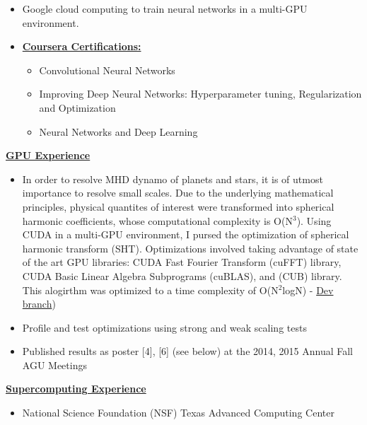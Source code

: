 \documentclass[11pt]{ltxdoc}
\begin{document}
\begin{description}
\begin{itemize}
\begin{itemize}
\begin{itemize}
        	    \end{itemize}
        	\end{itemize}
        \item Google cloud computing to train neural networks in a multi-GPU environment.
        \item[] \textbf{\underline{Coursera Certifications:}}
        \begin{itemize}
          \item Convolutional Neural Networks
          \item Improving Deep Neural Networks: Hyperparameter tuning, Regularization and Optimization
          \item Neural Networks and Deep Learning
        \end{itemize}
      \end{itemize}
      
    \item[] \textbf{\underline{GPU Experience}}
    \begin{itemize}
    		\item In order to resolve MHD dynamo of planets and stars, it is of utmost importance to resolve small scales. Due to the underlying mathematical principles, physical quantites of interest were transformed into spherical harmonic coefficients, whose computational complexity is O(N$^3$). Using CUDA in a multi-GPU environment, I pursed the optimization of spherical harmonic transform (SHT). Optimizations involved taking advantage of state of the art GPU libraries: CUDA Fast Fourier Transform (cuFFT) library, CUDA Basic Linear Algebra Subprograms (cuBLAS), and (CUB) library. This alogirthm was optimized to a time complexity of O(N$^2$logN) - \href{https://github.com/hlokavarapu/calypso/tree/concurrency/src/Cuda_libraries}{Dev branch})
          	\item Profile and test optimizations using strong and weak scaling tests        	
          	\item Published results as poster [4], [6] (see below) at the 2014, 2015 Annual Fall AGU Meetings
    \end{itemize}
    
    \item[] \textbf{\underline{Supercomputing Experience}}
    
      \vskip 06pt 
      
      \begin{itemize}
        
        \item National Science Foundation (NSF) Texas Advanced Computing Center
      

\end{itemize}
\end{description}
\end{document}
